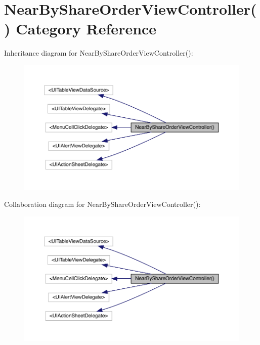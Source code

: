 \hypertarget{category_near_by_share_order_view_controller_07_08}{}\section{Near\+By\+Share\+Order\+View\+Controller() Category Reference}
\label{category_near_by_share_order_view_controller_07_08}


Inheritance diagram for Near\+By\+Share\+Order\+View\+Controller()\+:\nopagebreak
\begin{figure}[H]
\begin{center}
\leavevmode
\includegraphics[width=350pt]{category_near_by_share_order_view_controller_07_08__inherit__graph}
\end{center}
\end{figure}


Collaboration diagram for Near\+By\+Share\+Order\+View\+Controller()\+:\nopagebreak
\begin{figure}[H]
\begin{center}
\leavevmode
\includegraphics[width=350pt]{category_near_by_share_order_view_controller_07_08__coll__graph}
\end{center}
\end{figure}
